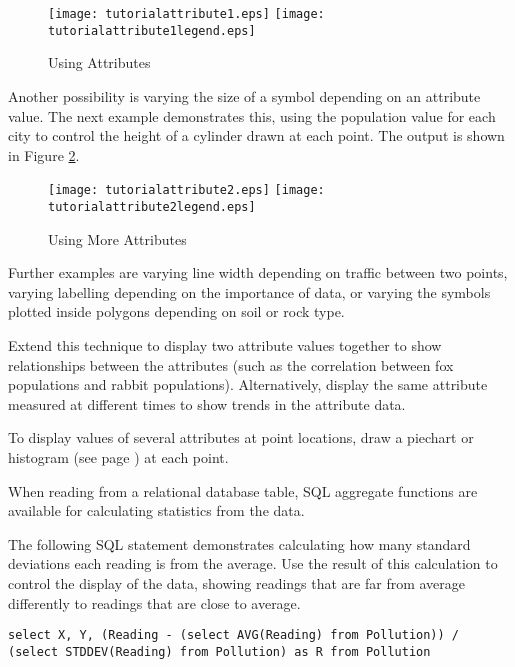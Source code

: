 

\begin{figure}[htb]
\texttt{[image: tutorialattribute1.eps]}
\texttt{[image: tutorialattribute1legend.eps]}
\caption{Using Attributes}
\label{tutorialattribute1}
\end{figure}

Another possibility is varying the size of a symbol depending
on an attribute value.  The next example demonstrates this, using the
population value for each city to control the height of a
cylinder drawn at each point.
The output is shown in Figure \ref{tutorialattribute2}.



\begin{figure}[htb]
\texttt{[image: tutorialattribute2.eps]}
\texttt{[image: tutorialattribute2legend.eps]}
\caption{Using More Attributes}
\label{tutorialattribute2}
\end{figure}

Further examples are varying line width depending on traffic between
two points, varying labelling depending on the importance of data,
or varying the symbols plotted inside
polygons depending on soil or rock type.

Extend this technique to display two attribute values together to show
relationships between the attributes (such as the correlation between fox
populations and rabbit populations).  Alternatively, display the same attribute
measured at different times to show trends in the attribute data.

To display values of several attributes at point locations, draw a
piechart or histogram (see page \pageref{piechart}) at each point.

When reading from a relational database table,
SQL aggregate functions are available for calculating
statistics from the data.

The following SQL statement demonstrates calculating how many
standard deviations each reading is from the average.  Use
the result of this calculation to control the display of the data,
showing readings that are far from average differently to readings
that are close to average.

\begin{verbatim}
select X, Y, (Reading - (select AVG(Reading) from Pollution)) /
(select STDDEV(Reading) from Pollution) as R from Pollution
\end{verbatim}


